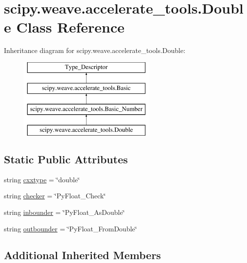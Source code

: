 \hypertarget{classscipy_1_1weave_1_1accelerate__tools_1_1Double}{}\section{scipy.\+weave.\+accelerate\+\_\+tools.\+Double Class Reference}
\label{classscipy_1_1weave_1_1accelerate__tools_1_1Double}
Inheritance diagram for scipy.\+weave.\+accelerate\+\_\+tools.\+Double\+:\begin{figure}[H]
\begin{center}
\leavevmode
\includegraphics[height=4.000000cm]{classscipy_1_1weave_1_1accelerate__tools_1_1Double}
\end{center}
\end{figure}
\subsection*{Static Public Attributes}
\begin{DoxyCompactItemize}
\item 
string \hyperlink{classscipy_1_1weave_1_1accelerate__tools_1_1Double_af2307247217507fd66da24f6aeaf89c0}{cxxtype} = \char`\"{}double\char`\"{}
\item 
string \hyperlink{classscipy_1_1weave_1_1accelerate__tools_1_1Double_a51d3a4e07ec98a877c40815f870d4252}{checker} = \char`\"{}Py\+Float\+\_\+\+Check\char`\"{}
\item 
string \hyperlink{classscipy_1_1weave_1_1accelerate__tools_1_1Double_ab8fdf5b7db631c794dfaf70e10423dd7}{inbounder} = \char`\"{}Py\+Float\+\_\+\+As\+Double\char`\"{}
\item 
string \hyperlink{classscipy_1_1weave_1_1accelerate__tools_1_1Double_a1544efbdbea3e7bfe0b14301371ca7a0}{outbounder} = \char`\"{}Py\+Float\+\_\+\+From\+Double\char`\"{}
\end{DoxyCompactItemize}
\subsection*{Additional Inherited Members}


